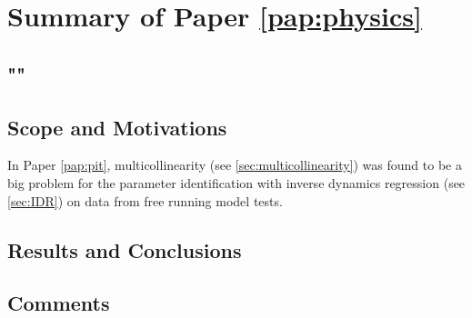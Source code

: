 \section{Summary of Paper \ref{pap:physics}}
\subsection*{""}
\subsection*{Scope and Motivations}
In Paper \ref{pap:pit}, multicollinearity (see \autoref{sec:multicollinearity}) was found to be a big problem for the parameter identification with inverse dynamics regression (see \autoref{sec:IDR}) on data from free running model tests. 

\subsection*{Results and Conclusions}
\subsection*{Comments}
\clearpage